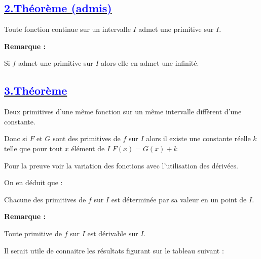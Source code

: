 \documentclass{article}
\begin{document}
\subsection*{\underline{\textbf{\textcolor{blue}{2.Théorème (admis)}}}}

Toute fonction continue sur un intervalle \( I \) admet une primitive sur \( I \).

\textbf{Remarque : }

Si \( f \) admet une primitive sur \( I \) alors elle en admet une infinité.

\subsection*{\underline{\textbf{\textcolor{blue}{3.Théorème }}}}

Deux primitives d'une même fonction sur un même intervalle diffèrent d'une constante.
 
Donc si \( F \) et \( G \) sont des primitives de \( f \) sur \( I \) alors il existe une constante réelle \( k \) telle que pour tout \( x \) élément de \( I \) \( F(x)=G(x)+k \)
 
Pour la preuve voir la variation des fonctions avec l'utilisation des dérivées.
 
On en déduit que : 
 
Chacune des primitives de \( f \) sur \( I \) est déterminée par sa valeur en un point de \( I \).

\textbf{Remarque :  }

Toute primitive de \( f \) sur \( I \) est dérivable sur \( I \).
 
Il serait utile de connaitre les résultats figurant sur le tableau suivant : 
\end{document}

